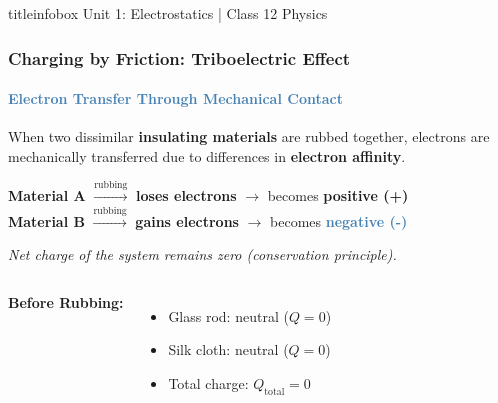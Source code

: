 \begin{frame}
\vfill

\begin{beamercolorbox}[wd=\textwidth,ht=0.5cm,dp=0.1cm,center]{titleinfobox}
    \small\color{coolgray} Unit 1: Electrostatics | Class 12 Physics
\end{beamercolorbox}
\end{frame}

\begin{frame}
\frametitle{\textsf{\textbf{Charging by Friction:} Triboelectric Effect}}
\framesubtitle{\textcolor{steelblue}{Electron Transfer Through Mechanical Contact}}

\vspace{-0.05cm}

\begin{keybox}
\vspace{0.1cm}
When two dissimilar \textbf{insulating materials} are rubbed together, electrons are mechanically transferred due to differences in \textbf{electron affinity}.
\begin{center}
\textbf{Material A} $\xrightarrow{\text{rubbing}}$ \textbf{loses electrons} $\rightarrow$ becomes \textcolor{importantRed}{\textbf{positive (+)}}\\[0.1cm]
\textbf{Material B} $\xrightarrow{\text{rubbing}}$ \textbf{gains electrons} $\rightarrow$ becomes \textcolor{steelblue}{\textbf{negative (-)}}
\end{center}
\textit{Net charge of the system remains zero (conservation principle).}
\end{keybox}

\vspace{0.3cm}

\begin{examplebox}
\vspace{0.15cm}
\begin{columns}[T]
    \textbf{Before Rubbing:}
    \begin{itemize}
        \item Glass rod: neutral ($Q = 0$)
        \item Silk cloth: neutral ($Q = 0$)
        \item Total charge: $Q_{\text{total}} = 0$
    \end{itemize}
    

\end{columns}
\end{examplebox}
\end{frame}
